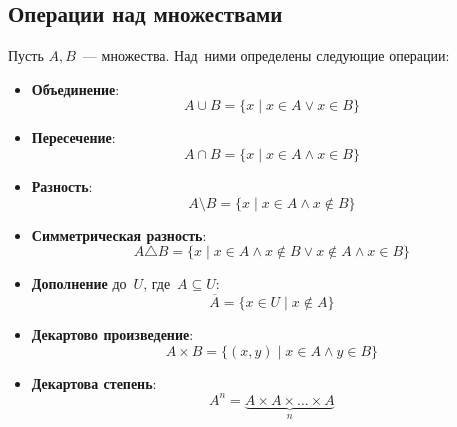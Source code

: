 \subsection{Операции над множествами}
	Пусть $A, B$~--- множества. Над~ними определены следующие операции:
\begin{itemize}
	\item \textbf{Объединение}:
	\[ A \cup B = \{ x \mid x \in A \lor x \in B \} \]
	\item \textbf{Пересечение}:
	\[ A \cap B = \{ x \mid x \in A \land x \in B \} \]
	\item \textbf{Разность}:
	\[ A \setminus B = \{ x \mid x \in A \land x \notin B \} \]
	\item \textbf{Симметрическая разность}:
	\[ A \triangle B = \{ x \mid x \in A \land x \notin B \lor x \notin A \land x \in B \} \]
	\item \textbf{Дополнение} до~$U$, где~$A \subseteq U$:
	\[ \overline A = \{ x \in U \mid x \notin A \} \]
	\item \textbf{Декартово произведение}:
	\[ A \times B = \{ (x, y) \mid x \in A \land y \in B \} \]
	\item \textbf{Декартова степень}:
	\[ A^n = \underbrace{A \times A \times \ldots \times A}_n \]
\end{itemize}


